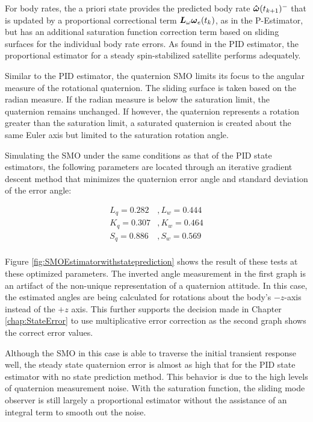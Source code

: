 For body rates, the a priori state provides the predicted body rate $\boldsymbol{\hat{\omega}}(t_{k+1})^-$ that is updated by a proportional correctional term $\boldsymbol{L}_{\omega} \boldsymbol{\omega}_e(t_{k})$, as in the P-Estimator, but has an additional saturation function correction term based on sliding surfaces for the individual body rate errors.  As found in the PID estimator, the proportional estimator for a steady spin-stabilized satellite performs adequately.

Similar to the PID estimator, the quaternion SMO limits its focus to the angular measure of the rotational quaternion.  The sliding surface is taken based on the radian measure.  If the radian measure is below the saturation limit, the quaternion remains unchanged.  If however, the quaternion represents a rotation greater than the saturation limit, a saturated quaternion is created about the same Euler axis but limited to the saturation rotation angle.

Simulating the SMO under the same conditions as that of the PID state estimators, the following parameters are located through an iterative gradient descent method that minimizes the quaternion error angle and standard deviation of the error angle:

\begin{equation}
  \begin{aligned}
    L_q = 0.282 &, L_w = 0.444 \\
    K_q = 0.307 &, K_w = 0.464 \\
    S_q = 0.886 &, S_w = 0.569 \\
  \end{aligned}
\end{equation}

Figure \ref{fig:SMOEstimatorwithstateprediction} shows the result of these tests at these optimized parameters.  The inverted angle measurement in the first graph is an artifact of the non-unique representation of a quaternion attitude.  In this case, the estimated angles are being calculated for rotations about the body's $-z$-axis instead of the $+z$ axis.  This further supports the decision made in Chapter \ref{chap:StateError} to use multiplicative error correction as the second graph shows the correct error values.

Although the SMO in this case is able to traverse the initial transient response well, the steady state quaternion error is almost as high that for the PID state estimator with no state prediction method.  This behavior is due to the high levels of quaternion measurement noise.  With the saturation function, the sliding mode observer is still largely a proportional estimator without the assistance of an integral term to smooth out the noise.

